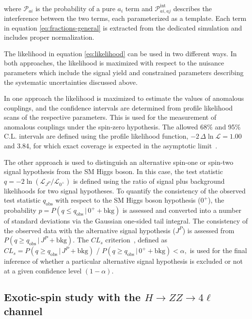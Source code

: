 where $\mathcal{P}_{ai}$ is the probability of a pure $a_i$ term and $\mathcal{P}^\text{int}_{ai, aj}$ describes
the interference between the two terms, each parameterized as a template.
Each term in equation \eqref{eq:fractions-general} is extracted from the dedicated simulation
and includes proper normalization.

The likelihood in equation \eqref{eq:likelihood} can be used in two different ways.
In both approaches, the likelihood is maximized with respect to the nuisance parameters which include the signal yield
and constrained parameters describing the systematic uncertainties discussed above.

In one approach the likelihood is maximized to estimate the values of anomalous couplings, and the confidence intervals are determined from profile likelihood scans of the respective parameters. This is used for the measurement of anomalous
couplings under the spin-zero hypothesis. The allowed 68\% and 95\% C.L. intervals are defined using the profile likelihood function, $-2\,\Delta \ln{\mathcal L} = 1.00$ and 3.84, for which exact coverage is expected in the asymptotic limit~\cite{Wilks:1938dza}.

The other approach is used to distinguish an alternative spin-one or spin-two signal hypothesis from the SM Higgs boson.
In this case, the test statistic $q=-2{\ln(\mathcal{L}_{J^P}/\mathcal{L}_{0^+})}$ is defined using the ratio
of signal plus background likelihoods for two signal hypotheses. To quantify the consistency of the observed test statistic
$q_\text{obs}$ with respect to the SM Higgs boson hypothesis ($0^+$), the probability $p = P( q \leq q_\text{obs} \, | \, 0^+ +\text{bkg} )$ is assessed and converted into a number of standard deviations via the Gaussian one-sided tail integral.
The consistency of the observed data with the alternative signal hypothesis ($J^P$) is assessed from
$P( q \geq q_\text{obs} \, | \, J^P + \text{bkg} )$. The $CL_{s}$ criterion~\cite{Read:2002hq,Junk:1999kv}, defined
as $CL_{s} = { P( q \geq q_\text{obs} \, | \, J^P + \text{bkg} ) }$ / ${ P( q \geq q_\text{obs} \, | \, 0^+ + \text{bkg} ) } < \alpha,$
is used for the final inference of whether a particular alternative signal hypothesis is excluded or not at a given confidence level $(1 -\alpha)$.

\subsection{Exotic-spin study with the $H \to ZZ \to 4\ell$ channel}
\label{sec:ResultsExotic}

